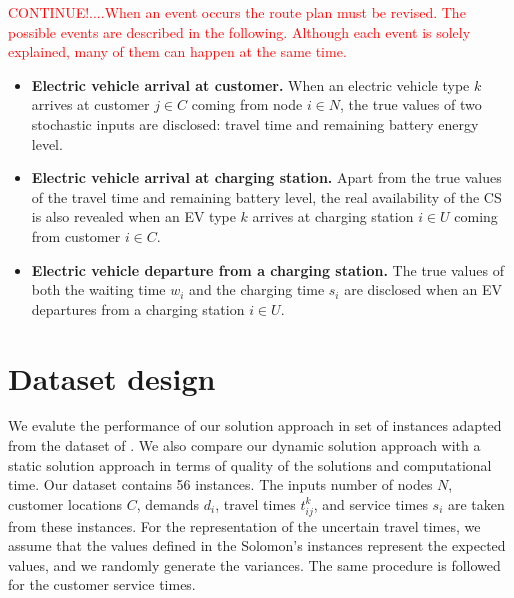 \documentclass[11pt]{article}
\begin{document}
\textcolor{red}{CONTINUE!....When an event occurs the route plan must be revised. The possible events are described in the following. Although each event is solely explained, many of them can happen at the same time.}

\begin{itemize}
\item \textbf{Electric vehicle arrival at customer.} 
When an electric vehicle type $k$ arrives at customer $j \in C$ coming from node $i \in N$, the true values of two stochastic inputs are disclosed: travel time and remaining battery energy level.
\item \textbf{Electric vehicle arrival at charging station.}
Apart from the true values of the travel time and remaining battery level, the real availability of the CS is also revealed when an EV type $k$ arrives at charging station $i \in U$ coming from customer $i \in C$. 
\item \textbf{Electric vehicle departure from a charging station.}
The true values of both the waiting time $w_i$ and the charging time $s_i$ are disclosed when an EV departures from a charging station $i \in U$. 
\end{itemize}

\section{Dataset design}
\label{section:dataset}
We evalute the performance of our solution approach in set of instances adapted from the dataset of \cite{Solomon1987}. We also compare our dynamic solution approach with a static solution approach in terms of quality of the solutions and computational time. Our dataset contains 56 instances. The inputs number of nodes $N$, customer locations $C$, demands $d_i$, travel times $t^k_{ij}$, and service times $s_i$ are taken from these instances. For the representation of the uncertain travel times, we assume that the values defined in the Solomon's instances represent the expected values, and we randomly generate the variances. The same procedure is followed for the customer service times. 
\end{document}
